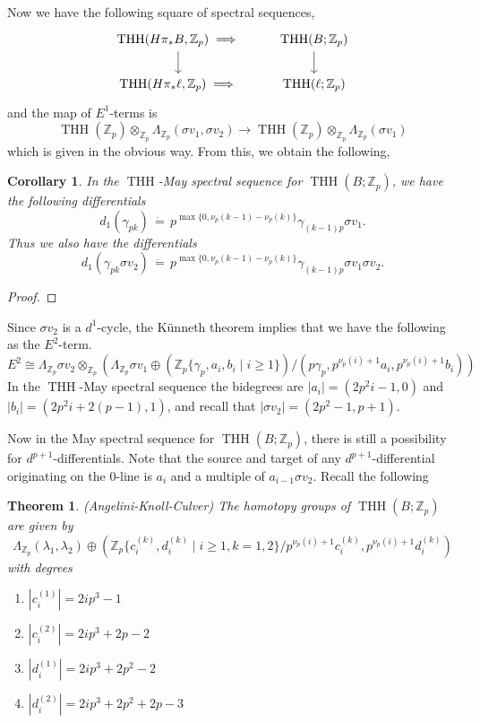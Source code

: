 \documentclass[12pt]{amsart}
\newcommand{\Z}{\mathbb{Z}}
\DeclareMathOperator{\THH}{THH}
\newtheorem{thm}[equation]{Theorem}
\newtheorem{cor}[equation]{Corollary}
\theoremstyle{definition}
\numberwithin{equation}{section}
\numberwithin{figure}{section}
\begin{document}
Now we have the following square of spectral sequences, 
\[
\begin{tikzcd}
	\THH(H\pi_*B, \Z_p)\implies \arrow[d]& \THH(B;\Z_p)\arrow[d]\\
	\THH(H\pi_*\ell, \Z_p)\implies & \THH(\ell; \Z_p)
\end{tikzcd}
\]
and the map of $E^1$-terms is
\[
\THH(\Z_p)\otimes_{\Z_p}\Lambda_{\Z_p}(\sigma v_1, \sigma v_2)\to \THH(\Z_p)\otimes_{\Z_p}\Lambda_{\Z_p}(\sigma v_1)
\]
which is given in the obvious way. From this, we obtain the following, 

\begin{cor}
	In the $\THH$-May spectral sequence for $\THH(B; \Z_p)$, we have the following differentials
	\[
	d_1(\gamma_{pk}) \, \dot{=}\, p^{\max\{0, \nu_p(k-1)-\nu_p(k)\}}\gamma_{(k-1)p}\sigma v_1.
	\]
	Thus we also have the differentials
	\[
	d_1(\gamma_{pk}\sigma v_2)\, \dot{=}\, p^{\max\{0, \nu_p(k-1)-\nu_p(k)\}}\gamma_{(k-1)p}\sigma v_1\sigma v_2.
	\]
\end{cor}
\begin{proof}
\end{proof}

Since $\sigma v_2$ is a $d^1$-cycle, the K\"unneth theorem implies that we have the following as the $E^2$-term. 
\[
E^2\cong \Lambda_{\Z_p}\sigma v_2\otimes_{\Z_p}\left(\Lambda_{\Z_p}\sigma v_1\oplus\left(\Z_p\{\gamma_p, a_i, b_i\mid i\geq 1\}\right)/(p\gamma_p, p^{\nu_p(i)+1}a_i,p^{\nu_p(i)+1}b_i)\right)
\]
In the $\THH$-May spectral sequence the bidegrees are $|a_i| = (2p^2i-1, 0)$ and $|b_i| = (2p^2i+2(p-1),1)$, and recall that $|\sigma v_2| = (2p^2-1,p+1)$.

Now in the May spectral sequence for $\THH(B;\Z_p)$, there is still a possibility for $d^{p+1}$-differentials. Note that the source and target of any $d^{p+1}$-differential originating on the 0-line is $a_i$ and a multiple of $a_{i-1}\sigma v_2$.  Recall the following

\begin{thm}(Angelini-Knoll-Culver)
	The homotopy groups of $\THH(B;\Z_p)$ are given by 
	\[
	\Lambda_{\Z_p}(\lambda_1, \lambda_2)\oplus \left(\Z_p\{c_i^{(k)}, d_i^{(k)}\mid i\geq 1, k=1,2\}/p^{\nu_p(i)+1}c_i^{(k)}, p^{\nu_p(i)+1}d_i^{(k)}\right)
	\]
	with degrees 
	\begin{enumerate}
		\item $|c_i^{(1)}| = 2ip^3-1$
		\item $|c_i^{(2)}| = 2ip^3+2p-2$
		\item $|d_i^{(1)}| = 2ip^3+2p^2-2$
		\item $|d_i^{(2)}| = 2ip^3+2p^2+2p-3$
	\end{enumerate}
\end{thm}
\end{document}
